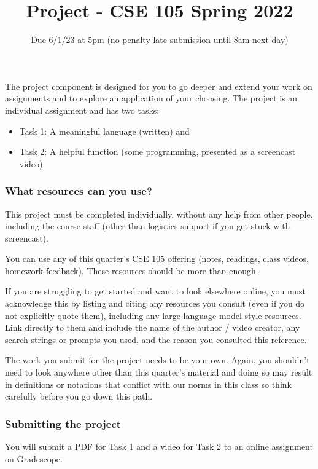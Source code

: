 \documentclass[12pt, oneside]{article}
\begin{document}
\title{Project - CSE 105 Spring 2022}
\date{Due 6/1/23 at 5pm (no penalty late submission until 8am next day)}


\maketitle

\thispagestyle{fancy}

The project component is designed for you to go deeper and extend your work on assignments 
and to explore an application of your choosing. 
The project is an individual assignment and has 
two tasks: 
\begin{itemize}
    \item Task 1: A meaningful language (written) and \item Task 2: A helpful function (some programming, presented as a screencast video).
\end{itemize}
\vspace{-20pt}


\subsubsection*{What resources can you use?}
This project must be completed individually, without any help from other people, 
including the course staff (other than logistics support if you get stuck with screencast). 

You can use any of this quarter's CSE 105 offering (notes, readings, class videos, homework feedback). 
These resources should be more than enough. 

If you are struggling to get started and want to 
look elsewhere online, you must acknowledge this by listing and 
citing any resources you consult 
(even if you do not explicitly quote them), including any large-language model style resources. 
Link directly to them and include the name of the 
author / video creator, any search strings or prompts you used, and the reason you consulted this reference. 

The work you submit for 
the project needs to be your own. Again, you shouldn't need to look anywhere other 
than this quarter's material and doing so may result in definitions or notations 
that conflict with our norms in this class so think carefully before you go down this path.

\subsubsection*{Submitting the project}
You will submit a PDF for Task 1 and a video for Task 2 
to an online assignment on Gradescope.
\end{document}
